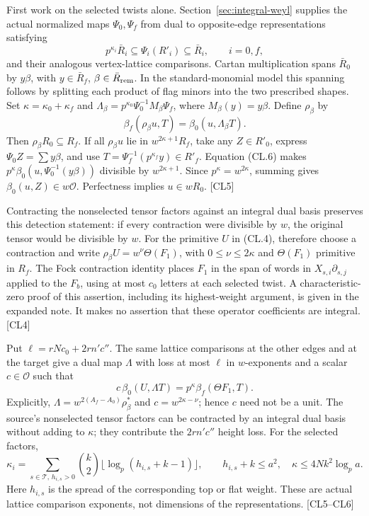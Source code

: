 \documentclass[11pt,a4paper]{article}
\numberwithin{equation}{section}
\theoremstyle{remark}\newtheorem{remark}[theorem]{Remark}
\begin{document}
First work on the selected twists alone. Section~\ref{sec:integral-weyl} supplies the actual normalized maps $\Psi_0,\Psi_f$ from dual to opposite-edge representations satisfying
\[
 p^{\kappa_i}\bar R_i\subseteq\Psi_i(R'_i)\subseteq\bar R_i,
 \qquad i=0,f,
 \tag{CL.5}\label{eq:cl-sandwich}
\]
and their analogous vertex-lattice comparisons. Cartan multiplication spans $\bar R_0$ by $y\beta$, with $y\in\bar R_f$, $\beta\in\bar R_{\rm rem}$. In the standard-monomial model this spanning follows by splitting each product of flag minors into the two prescribed shapes. Set $\kappa=\kappa_0+\kappa_f$ and
$\Lambda_\beta=p^{\kappa_0}\Psi_0^{-1}M_\beta\Psi_f$, where $M_\beta(y)=y\beta$. Define $\rho_\beta$ by
\[
 \beta_f(\rho_\beta u,T)=\beta_0(u,\Lambda_\beta T).
 \tag{CL.6}
\]
Then $\rho_\beta R_0\subseteq R_f$. If all $\rho_\beta u$ lie in $w^{2\kappa+1}R_f$, take any $Z\in R'_0$, express $\Psi_0Z=\sum y\beta$, and use $T=\Psi_f^{-1}(p^{\kappa_f}y)\in R'_f$. Equation (CL.6) makes $p^\kappa\beta_0(u,\Psi_0^{-1}(y\beta))$ divisible by $w^{2\kappa+1}$. Since $p^\kappa=w^{2\kappa}$, summing gives $\beta_0(u,Z)\in w\mathcal O$. Perfectness implies $u\in wR_0$. \textsf{[CL5]}

Contracting the nonselected tensor factors against an integral dual basis preserves this detection statement: if every contraction were divisible by $w$, the original tensor would be divisible by $w$. For the primitive $U$ in (CL.4), therefore choose a contraction and write
$\rho_\beta U=w^\nu\Theta(F_1)$, with $0\le\nu\le2\kappa$ and $\Theta(F_1)$ primitive in $R_f$. The Fock contraction identity places $F_1$ in the span of words in $X_{s,i}\partial_{s,j}$ applied to the $F_b$, using at most $c_0$ letters at each selected twist. A characteristic-zero proof of this assertion, including its highest-weight argument, is given in the expanded note. It makes no assertion that these operator coefficients are integral. \textsf{[CL4]}

Put $\ell=rNc_0+2rn'c''$. The same lattice comparisons at the other edges and at the target give a dual map $\Lambda$ with loss at most $\ell$ in $w$-exponents and a scalar $c\in\mathcal O$ such that
\[
 c\,\beta_0(U,\Lambda T)=p^\kappa\beta_f(\Theta F_1,T).
 \tag{CL.7}\label{eq:cl-transfer}
\]
Explicitly, $\Lambda=w^{2(A_f-A_0)}\rho_\beta^*$ and $c=w^{2\kappa-\nu}$; hence $c$ need not be a unit. The source's nonselected tensor factors can be contracted by an integral dual basis without adding to $\kappa$; they contribute the $2rn'c''$ height loss. For the selected factors,
\[
 \kappa_i=\sum_{s\in\mathcal T,\,h_{i,s}>0}
 \binom{k}{2}\lfloor\log_p(h_{i,s}+k-1)\rfloor,
 \qquad h_{i,s}+k\le a^2,
 \quad\kappa\le4Nk^2\log_p a.
 \tag{CL.8}
\]
Here $h_{i,s}$ is the spread of the corresponding top or flat weight. These are actual lattice comparison exponents, not dimensions of the representations. \textsf{[CL5--CL6]}
\end{document}
